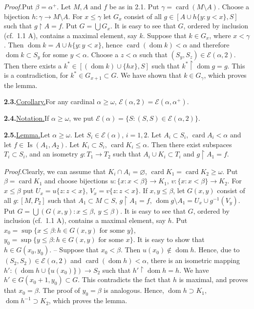 \documentclass[12pt,a4paper]{article}
\newcommand{\E}{\mathcal{E}}
\newcommand{\card}{\operatorname{card}}
\newcommand{\Is}{\operatorname{Is}}
\newcommand{\dom}{\operatorname{dom}}
\newcommand{\res}{\mathbin{\upharpoonright}}
\newcommand{\itemhead}[2]{\par\noindent\textbf{#1.}\enspace\underline{#2.}\enspace}
\newcommand{\prooftext}{\par\textit{Proof.}\enspace}
\begin{document}
\prooftext Put $\beta=\alpha^+$. Let $M,A$ and $f$ be as in 2.1. Put $\gamma=\card(M\setminus A)$. Choose a bijection $h:\gamma\longrightarrow M\setminus A$. For $x\leq\gamma$ let $G_x$ consist of all $g\in[A\cup h\{y:y<x\},S]$ such that $g\res A=f$. Put $G=\bigcup G_x$. It is easy to see that $G$, ordered by inclusion (cf.\ 1.1 A), contains a maximal element, say $k$. Suppose that $k\in G_x$, where $x<\gamma$. Then $\dom k=A\cup h\{y:y<x\}$, hence $\card(\dom k)<\alpha$ and therefore $\dom k\subset S_y$ for some $y<\alpha$. Choose a $z<\alpha$ such that $(S_y,S_z)\in\E(\alpha,2)$. Then there exists a $k^*\in[(\dom k)\cup\{hx\},S]$ such that $k^*\res\dom g=g$. This is a contradiction, for $k^*\in G_{x+1}\subset G$. We have shown that $k\in G_\gamma$, which proves the lemma.

\itemhead{2.3}{Corollary}For any cardinal $\alpha\geq\omega$, $\E(\alpha,2)=\E(\alpha,\alpha^+)$.

\itemhead{2.4}{Notation}If $\alpha\geq\omega$, we put $\E(\alpha)=\{S:(S,S)\in\E(\alpha,2)\}$.

\newpage %
\itemhead{2.5}{Lemma}Let $\alpha\geq\omega$. Let $S_i\in\E(\alpha)$, $i=1,2$. Let $A_i\subset S_i$, $\card A_i<\alpha$ and let $f\in\Is(A_1,A_2)$. Let $K_i\subset S_i$, $\card K_i\leq\alpha$. Then there exist subspaces $T_i\subset S_i$, and an isometry $g:T_1\longrightarrow T_2$ such that $A_i\cup K_i\subset T_i$ and $g\res A_1=f$.

\prooftext Clearly, we can assume that $K_i\cap A_i=\varnothing$, $\card K_1=\card K_2\geq\omega$. Put $\beta=\card K_1$ and choose bijections $u:\{x:x<\beta\}\longrightarrow K_1$, $v:\{x:x<\beta\}\longrightarrow K_2$. For $x\leq\beta$ put $U_x=u\{z:z<x\}$, $V_x=v\{z:z<x\}$. If $x,y\leq\beta$, let $G(x,y)$ consist of all $g:[M,P_2]$ such that $A_1\subset M\subset S$, $g\res A_1=f$, $\dom g\setminus A_1=U_x\cup g^{-1}(V_y)$. Put $G=\bigcup(G(x,y):x\leq\beta,\ y\leq\beta)$. It is easy to see that $G$, ordered by inclusion (cf.\ 1.1 A), contains a maximal element, say $h$. Put $x_0=\sup\{x\leq\beta:h\in G(x,y)\text{ for some }y\}$, $y_0=\sup\{y\leq\beta:h\in G(x,y)\text{ for some }x\}$. It is easy to show that $h\in G(x_0,y_0)$. -- Suppose that $x_0<\beta$. Then $u(x_0)\notin\dom h$. Hence, due to $(S_2,S_2)\in\E(\alpha,2)$ and $\card(\dom h)<\alpha$, there is an isometric mapping $h':(\dom h\cup\{u(x_0)\})\longrightarrow S_2$ such that $h'\res\dom h=h$. We have $h'\in G(x_0+1,y_0)\subset G$. This contradicts the fact that $h$ is maximal, and proves that $x_0=\beta$. The proof of $y_0=\beta$ is analogous. Hence, $\dom h\supset K_1$, $\dom h^{-1}\supset K_2$, which proves the lemma.
\end{document}
